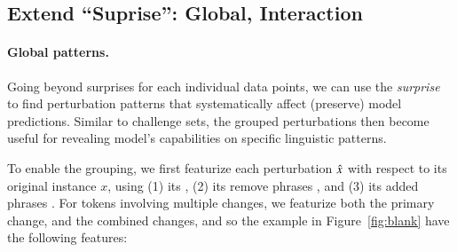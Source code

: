 \begin{comment}
****
The examples generated by BERT.
****

  P: The quarterback of the UTEP football team is about to be tackled by a member of the Wisconsin defensive team.
  H: The quarterback is about to be tackled by the opposing team.
 Pr: entailment
 NP: Another quarterback is about to be tackled by the opposing team.
NPr: neutral
weight:  0.122
flip_unimportant_feature 0.013 {The}

  P: The quarterback of the UTEP football team is about to be tackled by a member of the Wisconsin defensive team.
  H: The quarterback is about to be tackled by the opposing team.
 Pr: entailment
 NP: Jack is about to be tackled by the opposing team.
NPr: neutral
weight:  0.461
flip_unimportant_feature 0.028 {The, quarterback}


  P: The quarterback of the UTEP football team is about to be tackled by a member of the Wisconsin defensive team.
  H: The quarterback is about to be tackled by the opposing team.
 Pr: entailment
 NP: The quarterback is about to be tackled by someone
NPr: entailment
weight:  0.218
unflip_important_feature 0.3 {team, the, ., opposing}

  P: The quarterback of the UTEP football team is about to be tackled by a member of the Wisconsin defensive team.
  H: The quarterback is about to be tackled by the opposing team.
 Pr: entailment
 NP: The quarterback is about to be tackled by the second team.
NPr: entailment
weight:  0.292
unflip_important_feature 0.149 {opposing}


\end{comment}


\subsection{Extend ``Suprise'': Global, Interaction}
\paragraph{Global patterns.}
Going beyond surprises for each individual data points, we can use the \emph{surprise} to find perturbation patterns that systematically affect (preserve) model predictions.
Similar to challenge sets, the grouped perturbations then become useful for revealing model's capabilities on specific linguistic patterns.

To enable the grouping, we first featurize each perturbation $\hat{x}$ with respect to its original instance $x$, using 
(1) its \tagstr {}, 
(2) its remove phrases , and 
(3) its added phrases .
For tokens involving multiple changes, we featurize both the primary change, and the combined changes, and so the example in Figure~\ref{fig:blank} have the following features:

